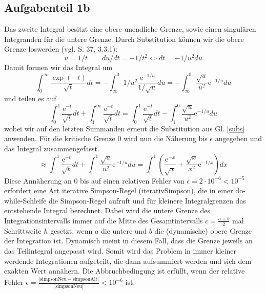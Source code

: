 \subsection*{Aufgabenteil 1b}
Das zweite Integral besitzt eine obere unendliche Grenze, sowie einen singulären Integranden für die untere Grenze.
Durch Substitution können wir die obere Grenze loswerden (vgl. S. 37, 3.3.1):
\begin{equation}
u = 1/t \qquad du/dt = - 1/t^2 \Leftrightarrow dt = -1/u^2 du
\label{subs}
\end{equation}
Damit formen wir das Integral um
\begin{equation*}
\int_0^{\infty} \frac{\exp(-t)}{\sqrt{t}}dt = - \int_{\infty}^0 1/u^2 \frac{\mathup{e}^{-1/u}}{1/\sqrt{u}} du= - \int_{\infty}^0 \frac{\sqrt{u}}{u^2} \mathup{e}^{-1/u} du
\end{equation*}
und teilen es auf
\begin{equation*}
\int_0^1 \frac{\mathup{e}^{-t}}{\sqrt{t}} dt + \int_1^{\infty} \frac{\mathup{e}^{-t}}{\sqrt{t}}dt = \int_0^1 \frac{\mathup{e}^{-t}}{\sqrt{t}} dt - \int_{1}^0 \frac{\sqrt{u}}{u^2} \mathup{e}^{-1/u} du
\end{equation*}
wobei wir auf den letzten Summanden erneut die Substitution aus Gl. \eqref{subs} anwenden. Für die kritische Grenze 0 wird nun die Näherung bis $\epsilon$ angegeben und das Integral zusammengefasst.
\begin{equation*}
\approx \int_{\epsilon}^1 \frac{\mathup{e}^{-t}}{\sqrt{t}} dt+ \int_{\epsilon}^1 \frac{\sqrt{u}}{u^2} \mathup{e}^{-1/u} du = \int_{\epsilon}^1 \left(\frac{\mathup{e}^{-x}}{\sqrt{x}}+ \frac{\sqrt{x}}{x^2} \mathup{e}^{-1/x}\right) dx
\end{equation*}
Diese Annäherung an 0 bis auf einen relativen Fehler von $\epsilon = 2 \cdot 10^{-6} < 10^{-5}$ erfordert eine Art iterative Simpson-Regel (iterativSimpson), die in einer do-while-Schleife die Simpson-Regel aufruft und für kleinere Integralgrenzen das entstehende Integral berechnet. Dabei wird die untere Grenze des Integrationsintervalls immer auf die Mitte des Gesamtintervalls $c = \frac{a+b}{2}$ mal Schrittweite $h$ gesetzt, wenn $a$ die untere und $b$ die (dynamische) obere Grenze der Integration ist. Dynamisch meint in diesem Fall, dass die Grenze jeweils an das Teilintegral angepasst wird. Somit wird das Problem in immer kleiner werdende Integrationen aufgeteilt, die dann aufsummiert werden und sich dem exakten Wert annähern.
Die Abbruchbedingung ist erfüllt, wenn der relative Fehler $\epsilon = \frac{|\text{simpsonNeu}-\text{simpsonAlt}|}{|\text{simpsonNeu}|} < 10^{-6}$ ist.

